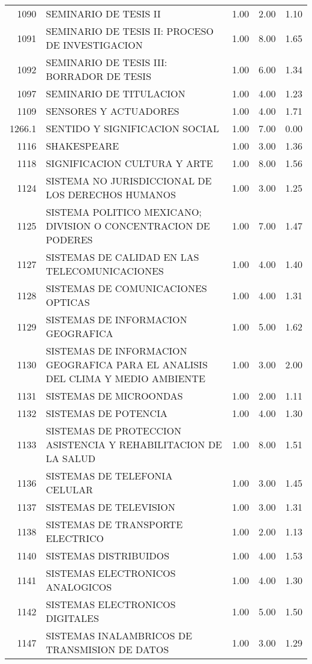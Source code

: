 \begin{table}[ht]
\begin{tabular}{rlrrr}
  1090 & SEMINARIO DE TESIS II & 1.00 & 2.00 & 1.10 \\ 
  1091 & SEMINARIO DE TESIS II: PROCESO DE INVESTIGACION & 1.00 & 8.00 & 1.65 \\ 
  1092 & SEMINARIO DE TESIS III: BORRADOR DE TESIS & 1.00 & 6.00 & 1.34 \\ 
  1097 & SEMINARIO DE TITULACION & 1.00 & 4.00 & 1.23 \\ 
  1109 & SENSORES Y ACTUADORES & 1.00 & 4.00 & 1.71 \\ 
  1266.1 & SENTIDO Y SIGNIFICACION SOCIAL & 1.00 & 7.00 & 0.00 \\ 
  1116 & SHAKESPEARE & 1.00 & 3.00 & 1.36 \\ 
  1118 & SIGNIFICACION CULTURA Y ARTE & 1.00 & 8.00 & 1.56 \\ 
  1124 & SISTEMA NO JURISDICCIONAL DE LOS DERECHOS HUMANOS & 1.00 & 3.00 & 1.25 \\ 
  1125 & SISTEMA POLITICO MEXICANO; DIVISION O CONCENTRACION DE PODERES & 1.00 & 7.00 & 1.47 \\ 
  1127 & SISTEMAS DE CALIDAD EN LAS TELECOMUNICACIONES & 1.00 & 4.00 & 1.40 \\ 
  1128 & SISTEMAS DE COMUNICACIONES OPTICAS & 1.00 & 4.00 & 1.31 \\ 
  1129 & SISTEMAS DE INFORMACION GEOGRAFICA & 1.00 & 5.00 & 1.62 \\ 
  1130 & SISTEMAS DE INFORMACION GEOGRAFICA PARA EL ANALISIS DEL CLIMA Y MEDIO AMBIENTE & 1.00 & 3.00 & 2.00 \\ 
  1131 & SISTEMAS DE MICROONDAS & 1.00 & 2.00 & 1.11 \\ 
  1132 & SISTEMAS DE POTENCIA & 1.00 & 4.00 & 1.30 \\ 
  1133 & SISTEMAS DE PROTECCION ASISTENCIA Y REHABILITACION DE LA SALUD & 1.00 & 8.00 & 1.51 \\ 
  1136 & SISTEMAS DE TELEFONIA CELULAR & 1.00 & 3.00 & 1.45 \\ 
  1137 & SISTEMAS DE TELEVISION & 1.00 & 3.00 & 1.31 \\ 
  1138 & SISTEMAS DE TRANSPORTE ELECTRICO & 1.00 & 2.00 & 1.13 \\ 
  1140 & SISTEMAS DISTRIBUIDOS & 1.00 & 4.00 & 1.53 \\ 
  1141 & SISTEMAS ELECTRONICOS ANALOGICOS & 1.00 & 4.00 & 1.30 \\ 
  1142 & SISTEMAS ELECTRONICOS DIGITALES & 1.00 & 5.00 & 1.50 \\ 
  1147 & SISTEMAS INALAMBRICOS DE TRANSMISION DE DATOS & 1.00 & 3.00 & 1.29 \\ 

\end{tabular}
\end{table}
